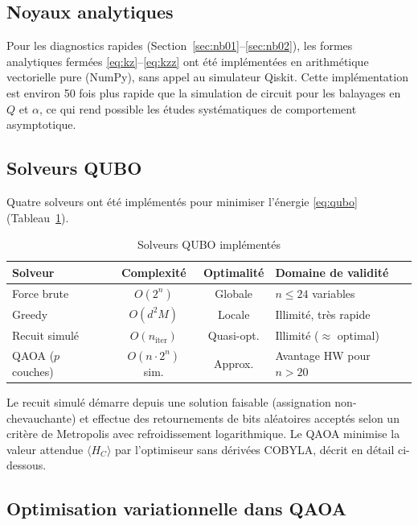 \documentclass[12pt,a4paper]{article}
\begin{document}
\subsection{Noyaux analytiques}

Pour les diagnostics rapides (Section~\ref{sec:nb01}--\ref{sec:nb02}),
les formes analytiques fermées \eqref{eq:kz}--\eqref{eq:kzz} ont été
implémentées en arithmétique vectorielle pure (NumPy), sans appel au
simulateur Qiskit.
Cette implémentation est environ 50 fois plus rapide que la simulation
de circuit pour les balayages en $Q$ et $\alpha$, ce qui rend possible
les études systématiques de comportement asymptotique.

\subsection{Solveurs QUBO}

Quatre solveurs ont été implémentés pour minimiser l'énergie \eqref{eq:qubo}
(Tableau~\ref{tab:solvers}).

\begin{table}[H]
\centering
\caption{Solveurs QUBO implémentés}
\label{tab:solvers}
\begin{tabular}{@{}lccl@{}}
\toprule
\textbf{Solveur} & \textbf{Complexité} & \textbf{Optimalité} & \textbf{Domaine de validité} \\
\midrule
Force brute  & $O(2^n)$        & Globale     & $n \leq 24$ variables \\
Greedy       & $O(d^2 M)$      & Locale      & Illimité, très rapide \\
Recuit simulé & $O(n_{\mathrm{iter}})$ & Quasi-opt. & Illimité ($\approx$ optimal) \\
QAOA ($p$ couches) & $O(n \cdot 2^n)$ sim. & Approx. & Avantage HW pour $n > 20$ \\
\bottomrule
\end{tabular}
\end{table}

Le recuit simulé démarre depuis une solution faisable (assignation
non-chevauchante) et effectue des retournements de bits aléatoires
acceptés selon un critère de Metropolis avec refroidissement logarithmique.
Le QAOA minimise la valeur attendue $\langle H_C \rangle$ par
l'optimiseur sans dérivées COBYLA, décrit en détail ci-dessous.

\subsection{Optimisation variationnelle dans QAOA}
\label{sec:qaoa_optim}
\end{document}
